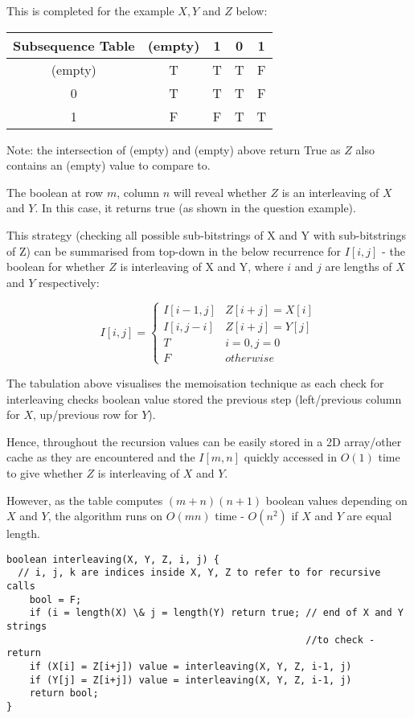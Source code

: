 \documentclass[11pt, a4paper]{article}
\begin{document}
This is completed for the example $X, Y$ and $Z$ below:

\begin{tabular}{ c | c | c | c | c }
  \hline			
  Subsequence Table & (empty) & 1 & 0 & 1 \\
  \hline			
  (empty) & T & T & T & F\\
  0 & T & T & T & F \\
  1 & F & F & T & T\\
  \hline  
\end{tabular}

Note: the intersection of (empty) and (empty) above return True as $Z$ also contains an (empty) value to compare to.

The boolean at row $m$, column $n$ will reveal whether $Z$ is an interleaving of $X$ and $Y$. In this case, it returns true (as shown in the question example).

This strategy (checking all possible sub-bitstrings of X and Y with sub-bitstrings of Z) can be summarised from top-down in the below recurrence for $I[i,j]$ - the boolean for whether $Z$ is interleaving of X and Y, where $i$ and $j$ are lengths of $X$ and $Y$ respectively:

\[ I[i,j] = \begin{cases}
  I[i-1, j] &  Z[i + j] = X[i]\\
  I[i, j-i] &  Z[i + j] = Y[j]\\
  T &  i = 0, j = 0\\
  F &  otherwise
        \end{cases}
\]

The tabulation above visualises the memoisation technique as each check for interleaving checks boolean value stored the previous step (left/previous column for $X$, up/previous row for $Y$).

Hence, throughout the recursion values can be easily stored in a 2D array/other cache as they are encountered and the $I[m, n]$ quickly accessed in $O(1)$ time to give whether $Z$ is interleaving of $X$ and $Y$.

However, as the table computes $(m + n)(n + 1)$ boolean values depending on $X$ and $Y$, the algorithm runs on $O(mn)$ time - $O(n^2)$ if $X$ and $Y$ are equal length.

\begin{lstlisting}[frame=single]
boolean interleaving(X, Y, Z, i, j) {
  // i, j, k are indices inside X, Y, Z to refer to for recursive calls
    bool = F;
    if (i = length(X) \& j = length(Y) return true; // end of X and Y strings
                                                    //to check - return
    if (X[i] = Z[i+j]) value = interleaving(X, Y, Z, i-1, j)
    if (Y[j] = Z[i+j]) value = interleaving(X, Y, Z, i-1, j)
    return bool;
}
\end{lstlisting}
\end{document}
